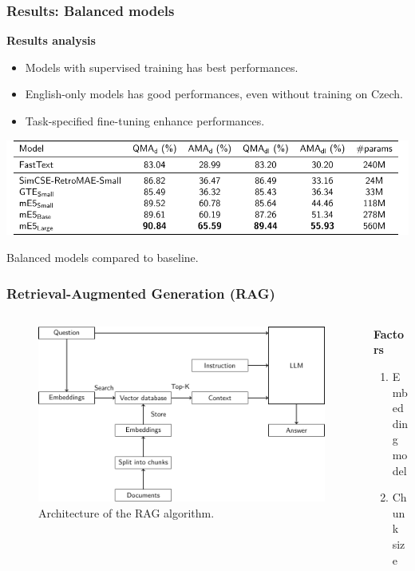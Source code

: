 \documentclass{beamer}
\begin{document}
\begin{frame}
  \frametitle{Results: Balanced models}
  \textcolor{cvut_navy}{\textbf{Results analysis}}
  \begin{itemize}
    \item Models with supervised training has best performances.
    \item English-only models has good performances, even without training on Czech.
    \item Task-specified fine-tuning enhance performances.
  \end{itemize}
  \begin{table}
    \centering
    \includegraphics[scale=0.8]{src/fig/pdfs/tables/balanced.pdf}
    \caption{Balanced models compared to baseline.}
  \end{table}
\end{frame}


\begin{frame}
  \frametitle{Retrieval-Augmented Generation (RAG)}
  \begin{columns}[onlytextwidth,T]
    \begin{column}{0.75\textwidth}
      \begin{figure}[h]
        \includegraphics[scale=0.6]{src/fig/pdfs/tikz/RAG_scheme.pdf}
        \caption{Architecture of the RAG algorithm.}
       \end{figure}
    \end{column}

    \begin{column}{0.75\textwidth}
      \textcolor{cvut_navy}{\textbf{Factors}}
      \begin{enumerate}
        \item Embedding \\model
        \item Chunk size
      \end{enumerate}
    \end{column}
  \end{columns}
\end{frame}
\end{document}
